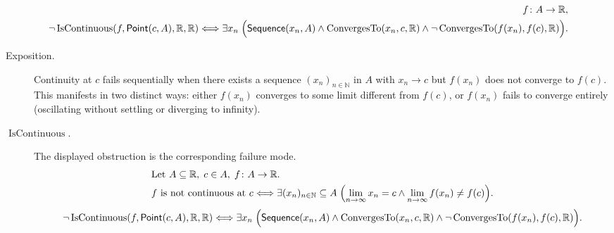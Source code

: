 \begin{remark*}
\[
\begin{aligned}
  f\colon A\to\mathbb{R},\\
\neg\operatorname{IsContinuous}(f,\mathsf{Point}(c,A),\mathbb R,\mathbb R)
\Longleftrightarrow
\exists x_n\;
\Bigl(\mathsf{Sequence}(x_n, A)
\land \operatorname{ConvergesTo}(x_n,c,\mathbb R)
\land \neg\operatorname{ConvergesTo}(f(x_n),f(c),\mathbb R)\Bigr).
\end{aligned}
\]
\end{remark*}

\begin{remark*}
\begin{description}
  \item[Exposition.]
Continuity at $c$ fails sequentially when there exists a sequence $(x_n)_{n\in\mathbb{N}}$ in $A$ with $x_n \to c$ but $f(x_n)$ does not converge to $f(c)$. This manifests in two distinct ways: either $f(x_n)$ converges to some limit different from $f(c)$, or $f(x_n)$ fails to converge entirely (oscillating without settling or diverging to infinity).


  \item[\(\operatorname{IsContinuous}.\)]
  The displayed obstruction is the corresponding failure mode.
  \[
\begin{aligned}
&\text{Let } A \subseteq \mathbb{R},\; c \in A,\; f \colon A \to \mathbb{R}.\\
&f \text{ is not continuous at } c \Longleftrightarrow
\exists (x_n)_{n\in\mathbb{N}} \subseteq A\;
\Bigl(\lim_{n\to\infty} x_n = c \land \lim_{n\to\infty} f(x_n) \ne f(c)\Bigr).
\end{aligned}
  \]
  \[
\neg\operatorname{IsContinuous}(f,\mathsf{Point}(c,A),\mathbb R,\mathbb R)
\Longleftrightarrow
\exists x_n\;
\Bigl(\mathsf{Sequence}(x_n, A)
\land \operatorname{ConvergesTo}(x_n,c,\mathbb R)
\land \neg\operatorname{ConvergesTo}(f(x_n),f(c),\mathbb R)\Bigr).
  \]
\end{description}
\end{remark*}

